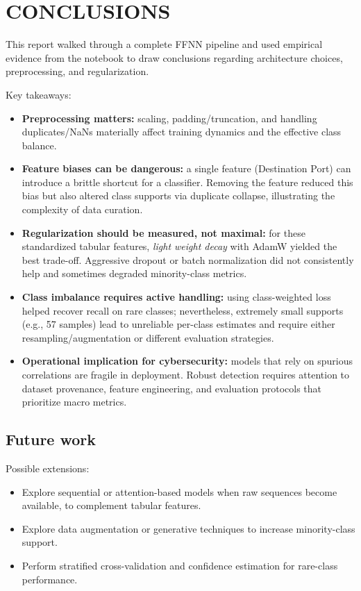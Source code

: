
\section{CONCLUSIONS} \label{sec:conclusions}

    This report walked through a complete FFNN pipeline and used empirical evidence from the notebook to draw conclusions regarding architecture choices, preprocessing, and regularization.

    Key takeaways:
    \begin{itemize}
        \item \textbf{Preprocessing matters:} scaling, padding/truncation, and handling duplicates/NaNs materially affect training dynamics and the effective class balance.
        \item \textbf{Feature biases can be dangerous:} a single feature (Destination Port) can introduce a brittle shortcut for a classifier. Removing the feature reduced this bias but also altered class supports via duplicate collapse, illustrating the complexity of data curation.
        \item \textbf{Regularization should be measured, not maximal:} for these standardized tabular features, \emph{light weight decay} with AdamW yielded the best trade-off. Aggressive dropout or batch normalization did not consistently help and sometimes degraded minority-class metrics.
        \item \textbf{Class imbalance requires active handling:} using class-weighted loss helped recover recall on rare classes; nevertheless, extremely small supports (e.g., 57 samples) lead to unreliable per-class estimates and require either resampling/augmentation or different evaluation strategies.
        \item \textbf{Operational implication for cybersecurity:} models that rely on spurious correlations are fragile in deployment. Robust detection requires attention to dataset provenance, feature engineering, and evaluation protocols that prioritize macro metrics.
    \end{itemize}

    \subsection{Future work}

        Possible extensions:
        \begin{itemize}
            \item Explore sequential or attention-based models when raw sequences become available, to complement tabular features.
            \item Explore data augmentation or generative techniques to increase minority-class support.
            \item Perform stratified cross-validation and confidence estimation for rare-class performance.
        \end{itemize}
